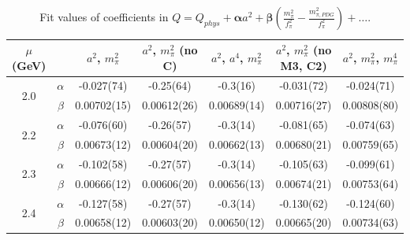 \documentclass[12pt]{extarticle}
\begin{document}
\begin{table}[h!]
\begin{center}
\begin{tabular}{|c c|c|c|c|c|c|}
\hline
$\mu$ (GeV) &  & $a^2$, $m_\pi^2$& $a^2$, $m_\pi^2$ (no C)& $a^2$, $a^4$, $m_\pi^2$& $a^2$, $m_\pi^2$ (no M3, C2)& $a^2$, $m_\pi^2$, $m_\pi^4$\\
\hline
\multirow{2}{0.5in}{2.0} & $\alpha$ & -0.027(74)& -0.25(64)& -0.3(16)& -0.031(72)& -0.024(71)\\
 & $\beta$ & 0.00702(15)& 0.00612(26)& 0.00689(14)& 0.00716(27)& 0.00808(80)\\
\hline
\multirow{2}{0.5in}{2.2} & $\alpha$ & -0.076(60)& -0.26(57)& -0.3(14)& -0.081(65)& -0.074(63)\\
 & $\beta$ & 0.00673(12)& 0.00604(20)& 0.00662(13)& 0.00680(21)& 0.00759(65)\\
\hline
\multirow{2}{0.5in}{2.3} & $\alpha$ & -0.102(58)& -0.27(57)& -0.3(14)& -0.105(63)& -0.099(61)\\
 & $\beta$ & 0.00666(12)& 0.00606(20)& 0.00656(13)& 0.00674(21)& 0.00753(64)\\
\hline
\multirow{2}{0.5in}{2.4} & $\alpha$ & -0.127(58)& -0.27(57)& -0.3(14)& -0.130(62)& -0.124(60)\\
 & $\beta$ & 0.00658(12)& 0.00603(20)& 0.00650(12)& 0.00665(20)& 0.00734(63)\\
\hline
\end{tabular}
\caption{Fit values of coefficients in $Q = Q_{phys} + \mathbf{\alpha} a^2 + \mathbf{\beta}\left(\frac{m_\pi^2}{f_\pi^2}-\frac{m_{\pi,PDG}^2}{f_\pi^2}\right) + \ldots$.}
\end{center}
\end{table}




















\clearpage
\end{document}
